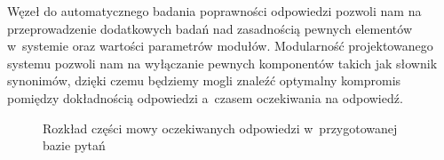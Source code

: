 Węzeł do automatycznego badania poprawności odpowiedzi pozwoli nam na przeprowadzenie dodatkowych badań nad zasadnością pewnych elementów w~systemie oraz wartości parametrów modułów. Modularność projektowanego systemu pozwoli nam na wyłączanie pewnych komponentów takich jak słownik synonimów, dzięki czemu będziemy mogli znaleźć optymalny kompromis pomiędzy dokładnością odpowiedzi a~czasem oczekiwania na odpowiedź.

\begin{figure}[h!]
    \label{fig:rozklad-typow-odpowiedzi2}  
    \caption{Rozkład części mowy oczekiwanych odpowiedzi w~przygotowanej bazie pytań}
\end{figure}